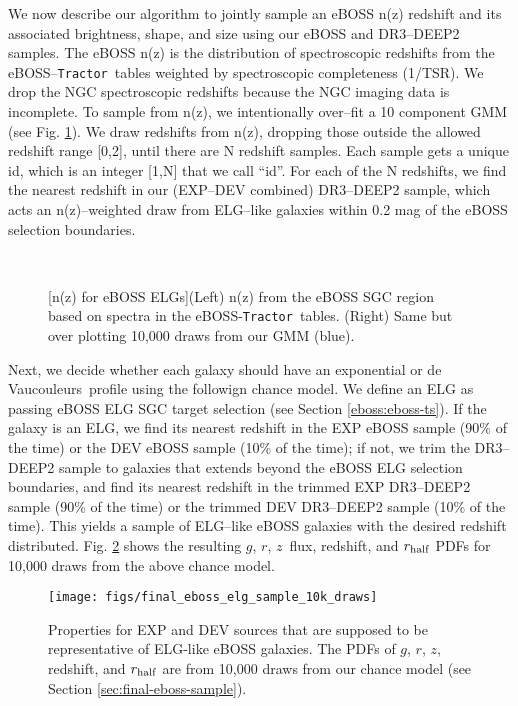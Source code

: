 \documentclass[a4paper,fleqn,usenatbib]{mnras}
\newcommand{\rhalf}{r_{\rm{half}}}
\newcommand{\gb}{$g$}
\newcommand{\rband}{$r$}
\newcommand{\zb}{$z$}
\newcommand{\tractor}{{\tt Tractor}}
\newcommand{\dev}{de Vaucouleurs}
\begin{document}
We now describe our algorithm to jointly sample an eBOSS n(z) redshift and its associated brightness, shape, and size using our eBOSS and DR3--DEEP2 samples. The eBOSS n(z) is the distribution of spectroscopic redshifts from the eBOSS--\tractor\, tables weighted by spectroscopic completeness (1/TSR). We drop the NGC spectroscopic redshifts because the NGC imaging data is incomplete. To sample from n(z), we intentionally over--fit a 10 component GMM (see Fig. \ref{fig:nz}). We draw redshifts from n(z), dropping those outside the allowed redshift range [0,2], until there are N redshift samples. Each sample gets a unique id, which is an integer [1,N] that we call ``id''. For each of the N redshifts, we find the nearest redshift in our (EXP--DEV combined) DR3--DEEP2 sample, which acts an n(z)--weighted draw from ELG--like galaxies within 0.2 mag of the eBOSS selection boundaries. 

\begin{figure}
\begin{center}
     \\
\end{center}
\caption{[n(z) for eBOSS ELGs](Left) n(z) from the eBOSS SGC region based on spectra in the eBOSS-\tractor\, tables. (Right) Same but over plotting 10,000 draws from our GMM (blue).}
\label{fig:nz}
\end{figure}

Next, we decide whether each galaxy should have an exponential or \dev\, profile using the followign chance model. We define an ELG as passing eBOSS ELG SGC target selection (see Section \ref{eboss:eboss-ts}). If the galaxy is an ELG, we find its nearest redshift in the EXP eBOSS sample (90\% of the time) or the DEV eBOSS sample (10\% of the time); if not, we trim the DR3--DEEP2 sample to galaxies that extends beyond the eBOSS ELG selection boundaries, and find its nearest redshift in the trimmed EXP DR3--DEEP2 sample (90\% of the time) or the trimmed DEV DR3--DEEP2 sample (10\% of the time). This yields a sample of ELG--like eBOSS galaxies with the desired redshift distributed. Fig. \ref{fig:final-eboss-sample-10k} shows the resulting \gb, \rband, \zb\, flux, redshift, and $\rhalf$ PDFs for 10,000 draws from the above chance model.

\begin{figure}
\begin{center}
 \texttt{[image: figs/final\_eboss\_elg\_sample\_10k\_draws]}
\end{center}
 \caption[Properties for EXP and DEV sources that are supposed to be representative of ELG-like eBOSS galaxies]{Properties for EXP and DEV sources that are supposed to be representative of ELG-like eBOSS galaxies. The PDFs of \gb, \rband, \zb, redshift, and $\rhalf$ are from 10,000 draws from our chance model (see Section \ref{sec:final-eboss-sample}).}
 \label{fig:final-eboss-sample-10k}
\end{figure}
\end{document}
